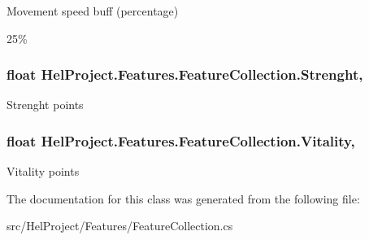 Movement speed buff (percentage) 

25\%\hypertarget{class_hel_project_1_1_features_1_1_feature_collection_a69632e8a405d871ac827107ddb4b24f3}{}
\subsubsection[{Strenght}]{\setlength{\rightskip}{0pt plus 5cm}float Hel\+Project.\+Features.\+Feature\+Collection.\+Strenght\hspace{0.3cm}{\ttfamily [get]}, {\ttfamily [set]}}\label{class_hel_project_1_1_features_1_1_feature_collection_a69632e8a405d871ac827107ddb4b24f3}


Strenght points 

\hypertarget{class_hel_project_1_1_features_1_1_feature_collection_a27719b073c6acce4f5faba5a437e1a70}{}
\subsubsection[{Vitality}]{\setlength{\rightskip}{0pt plus 5cm}float Hel\+Project.\+Features.\+Feature\+Collection.\+Vitality\hspace{0.3cm}{\ttfamily [get]}, {\ttfamily [set]}}\label{class_hel_project_1_1_features_1_1_feature_collection_a27719b073c6acce4f5faba5a437e1a70}


Vitality points 



The documentation for this class was generated from the following file\+:\begin{DoxyCompactItemize}
\item 
src/\+Hel\+Project/\+Features/Feature\+Collection.\+cs\end{DoxyCompactItemize}
